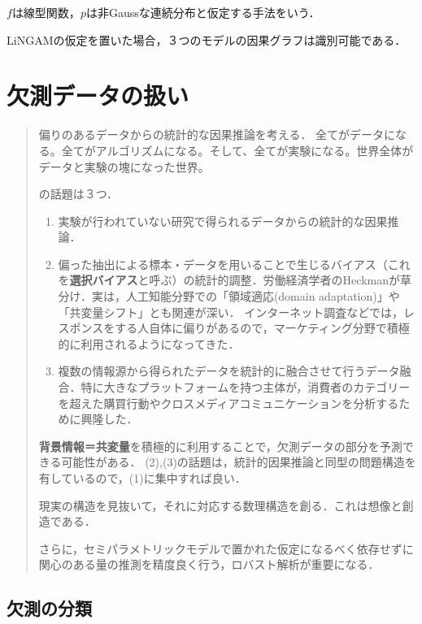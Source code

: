 \documentclass[uplatex,dvipdfmx]{jsreport}
\begin{document}
\begin{definition}
    $f$は線型関数，$p$は非Gaussな連続分布と仮定する手法をいう．
\end{definition}

\begin{theorem}
    LiNGAMの仮定を置いた場合，３つのモデルの因果グラフは識別可能である．\cite{清水08}
\end{theorem}

\chapter{欠測データの扱い}

\begin{quotation}
    偏りのあるデータからの統計的な因果推論を考える．
    全てがデータになる。全てがアルゴリズムになる。そして、全てが実験になる。世界全体がデータと実験の塊になった世界。

    \cite{星野}の話題は３つ．
    \begin{enumerate}
        \item 実験が行われていない研究で得られるデータからの統計的な因果推論．
        \item 偏った抽出による標本・データを用いることで生じるバイアス（これを\textbf{選択バイアス}と呼ぶ）の統計的調整．労働経済学者のHeckmanが草分け．実は，人工知能分野での「領域適応(domain adaptation)」や「共変量シフト」とも関連が深い．
        インターネット調査などでは，レスポンスをする人自体に偏りがあるので，マーケティング分野で積極的に利用されるようになってきた．
        \item 複数の情報源から得られたデータを統計的に融合させて行うデータ融合．特に大きなプラットフォームを持つ主体が，消費者のカテゴリーを超えた購買行動やクロスメディアコミュニケーションを分析するために興隆した．
    \end{enumerate}
    \textbf{背景情報＝共変量}を積極的に利用することで，欠測データの部分を予測できる可能性がある．
    (2),(3)の話題は，統計的因果推論と同型の問題構造を有しているので，(1)に集中すれば良い．

    現実の構造を見抜いて，それに対応する数理構造を創る．これは想像と創造である．

    さらに，セミパラメトリックモデルで置かれた仮定になるべく依存せずに関心のある量の推測を精度良く行う，ロバスト解析が重要になる．
\end{quotation}

\section{欠測の分類}
\end{document}
